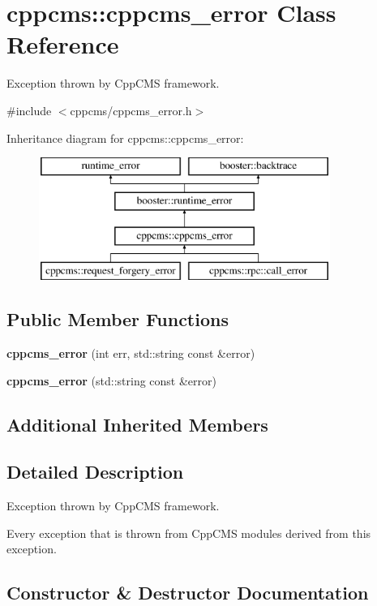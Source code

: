 \section{cppcms\-:\-:cppcms\-\_\-error Class Reference}
\label{classcppcms_1_1cppcms__error}


Exception thrown by Cpp\-C\-M\-S framework.  




{\ttfamily \#include $<$cppcms/cppcms\-\_\-error.\-h$>$}

Inheritance diagram for cppcms\-:\-:cppcms\-\_\-error\-:\begin{figure}[H]
\begin{center}
\leavevmode
\includegraphics[height=4.000000cm]{classcppcms_1_1cppcms__error}
\end{center}
\end{figure}
\subsection*{Public Member Functions}
\begin{DoxyCompactItemize}
\item 
{\bf cppcms\-\_\-error} (int err, std\-::string const \&error)
\item 
{\bf cppcms\-\_\-error} (std\-::string const \&error)
\end{DoxyCompactItemize}
\subsection*{Additional Inherited Members}


\subsection{Detailed Description}
Exception thrown by Cpp\-C\-M\-S framework. 

Every exception that is thrown from Cpp\-C\-M\-S modules derived from this exception. 

\subsection{Constructor \& Destructor Documentation}
